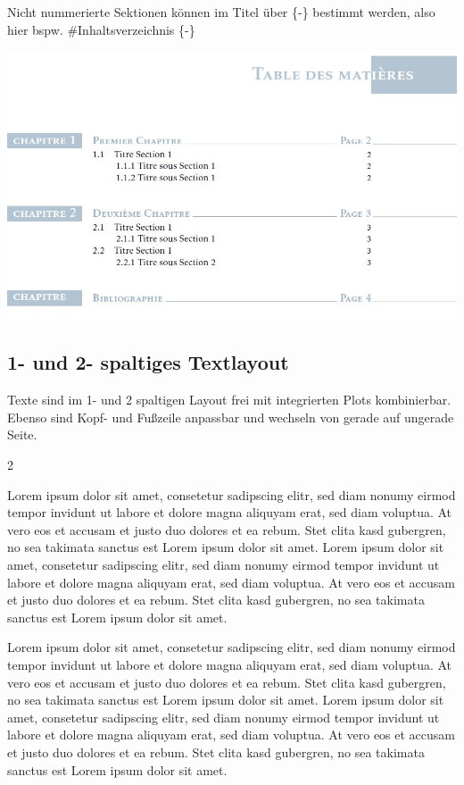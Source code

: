 \documentclass[
  a4paper,
  twoside]{article}
\begin{document}
Nicht nummerierte Sektionen können im Titel über \{-\} bestimmt werden,
also hier bspw. \#Inhaltsverzeichnis \{-\}

\includegraphics{B8obV.jpg}

\newpage

\hypertarget{und-2--spaltiges-textlayout}{%
\subsection{1- und 2- spaltiges
Textlayout}\label{und-2--spaltiges-textlayout}}

Texte sind im 1- und 2 spaltigen Layout frei mit integrierten Plots
kombinierbar. Ebenso sind Kopf- und Fußzeile anpassbar und wechseln von
gerade auf ungerade Seite.

\begin {multicols}{2}

Lorem ipsum dolor sit amet, consetetur sadipscing elitr, sed diam nonumy
eirmod tempor invidunt ut labore et dolore magna aliquyam erat, sed diam
voluptua. At vero eos et accusam et justo duo dolores et ea rebum. Stet
clita kasd gubergren, no sea takimata sanctus est Lorem ipsum dolor sit
amet. Lorem ipsum dolor sit amet, consetetur sadipscing elitr, sed diam
nonumy eirmod tempor invidunt ut labore et dolore magna aliquyam erat,
sed diam voluptua. At vero eos et accusam et justo duo dolores et ea
rebum. Stet clita kasd gubergren, no sea takimata sanctus est Lorem
ipsum dolor sit amet.

\columnbreak

Lorem ipsum dolor sit amet, consetetur sadipscing elitr, sed diam nonumy
eirmod tempor invidunt ut labore et dolore magna aliquyam erat, sed diam
voluptua. At vero eos et accusam et justo duo dolores et ea rebum. Stet
clita kasd gubergren, no sea takimata sanctus est Lorem ipsum dolor sit
amet. Lorem ipsum dolor sit amet, consetetur sadipscing elitr, sed diam
nonumy eirmod tempor invidunt ut labore et dolore magna aliquyam erat,
sed diam voluptua. At vero eos et accusam et justo duo dolores et ea
rebum. Stet clita kasd gubergren, no sea takimata sanctus est Lorem
ipsum dolor sit amet.

\end {multicols}
\end{document}

